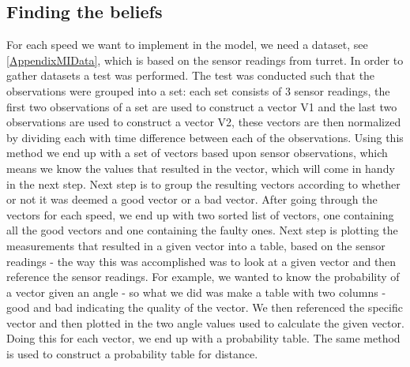 \subsection{Finding the beliefs}\label{filltable}
For each speed we want to implement in the model, we need a dataset, see
\autoref{AppendixMIData}, which is based on the sensor readings from turret. In
order to gather datasets a test was performed. The test was conducted such that
the observations were grouped into a set: each set consists of 3 sensor
readings, the first two observations of a set are used to construct a vector V1
and the last two observations are used to construct a vector V2, these vectors
are then normalized by dividing each with time difference between each of the observations. Using this method we end up
with a set of vectors based upon sensor observations, which means we know the
values that resulted in the vector, which will come in handy in the next step.
Next step is to group the resulting vectors according to whether or not it was
deemed a good vector or a bad vector. After going through the vectors for each
speed, we end up with two sorted list of vectors, one containing all the good
vectors and one containing the faulty ones. Next step is plotting the 
measurements that resulted in a given vector into a table, based on the sensor
readings - the way this was accomplished was to look at a given vector and then
reference the sensor readings. For example, we wanted to know the probability of
a vector given an angle - so what we did was make a table with two columns -
good and bad indicating the quality of the vector. We then referenced the
specific vector and then plotted in the two angle values used to calculate the
given vector. Doing this for each vector, we end up with a probability table.
The same method is used to construct a probability table for distance.

